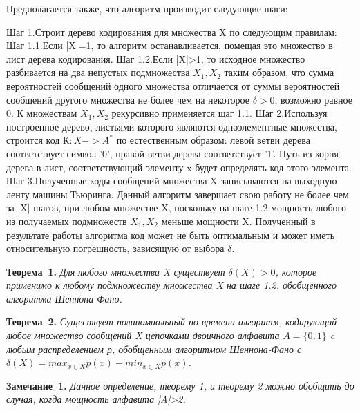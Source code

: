 \documentclass{spisok-article}
\begin{document}
Предполагается также, что алгоритм производит следующие шаги:
\newline

Шаг 1.Строит дерево кодирования для множества X по следующим правилам:
\newline
Шаг 1.1.Если |X|=1, то алгоритм останавливается, помещая это множество в лист дерева кодирования.
\newline
Шаг 1.2.Если |X|>1, то исходное множество разбивается на два непустых подмножества $X_1 , X_2$ таким образом, что сумма вероятностей сообщений одного множества отличается от суммы вероятностей сообщений другого множества не более чем на некоторое $\delta >0$, возможно равное 0. К множествам $X_1 , X_2$ рекурсивно применяется шаг 1.1.
\newline
Шаг 2.Используя построенное дерево, листьями которого являются одноэлементные множества, строится код $К: X -> A^{*}$ по естественным образом: левой ветви дерева соответствует символ '0', правой ветви дерева соответствует '1'. Путь из корня дерева в лист, соответствующий элементу x будет определять код этого элемента.
\newline
Шаг 3.Полученные коды сообщений множества X записываются на выходную ленту машины Тьюринга.
\newline
Данный алгоритм завершает свою работу не более чем за |X| шагов, при любом множестве X, поскольку на шаге 1.2 мощность любого из получаемых подмножеств $X_1 ,X_2$ меньше мощности X. Полученный в результате работы алгоритма код может не быть оптимальным и может иметь относительную погрешность, зависящую от выбора $\delta$. 

\noindent
\hbox{\bf Теорема 1.}
{\it Для любого множества X существует  $\delta(X)>0$, которое применимо к любому подмножеству множества X на шаге 1.2. обобщенного алгоритма Шеннона-Фано.}

\noindent
\hbox{\bf Теорема 2.}
{\it Существует полиномиальный по времени алгоритм, кодирующий любое множество сообщений X цепочками двоичного алфавита $A=\{0,1\}$  c любым распределением р, обобщенным алгоритмом Шеннона-Фано с $\delta(X)=max_{x\in X}p(x)-min_{x\in X}p(x)$.}

\noindent
\hbox{\bf Замечание 1.}
{\it Данное определение, теорему 1, и теорему  2 можно обобщить до случая, когда мощность алфавита |A|>2.}
\end{document}
